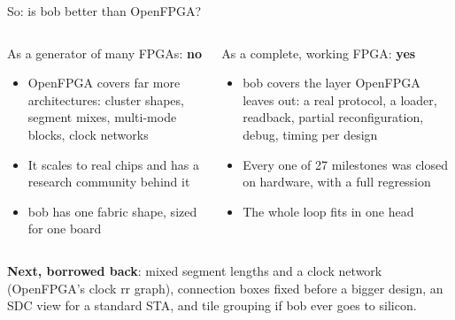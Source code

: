 \documentclass[aspectratio=169,11pt]{beamer}
\begin{document}
\begin{frame}{So: is bob better than OpenFPGA?}
  \begin{columns}[T]
    \begin{block}{As a generator of many FPGAs: \textbf{no}}
      \small
      \begin{itemize}
        \item OpenFPGA covers far more architectures: cluster shapes, segment mixes, multi-mode blocks, clock networks
        \item It scales to real chips and has a research community behind it
        \item bob has one fabric shape, sized for one board
      \end{itemize}
    \end{block}
    \begin{block}{As a complete, working FPGA: \textbf{yes}}
      \small
      \begin{itemize}
        \item bob covers the layer OpenFPGA leaves out: a real protocol, a loader, readback, partial reconfiguration, debug, timing per design
        \item Every one of 27 milestones was closed on hardware, with a full regression
        \item The whole loop fits in one head
      \end{itemize}
    \end{block}
  \end{columns}
  \vspace{4mm}
  \begin{columns}[T]
    \small
    \textbf{Next, borrowed back}: mixed segment lengths and a clock network (OpenFPGA's clock rr graph), connection boxes fixed before a bigger design, an SDC view for a standard STA, and tile grouping if bob ever goes to silicon.
  \end{columns}
\end{frame}
\end{document}

